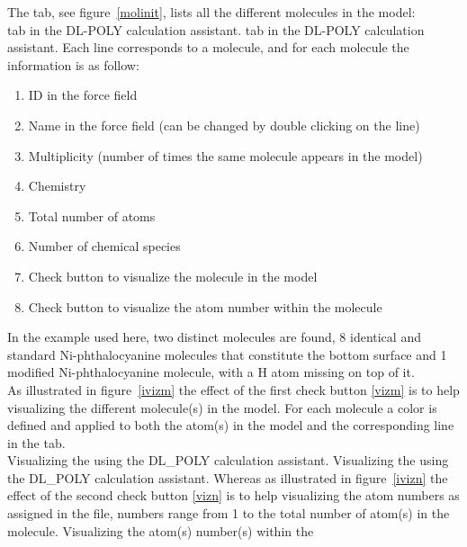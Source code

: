 The  tab, see figure~\ref{molinit}, lists all the different molecules in the model: \\
{ tab in the DL-POLY calculation assistant.}
{ tab in the DL-POLY calculation assistant.}
\clearpage
\noindent Each line corresponds to a molecule, and for each molecule the information is as follow: 
\begin{enumerate}
\item ID in the force field
\item Name in the force field (can be changed by double clicking on the line)
\item Multiplicity (number of times the same molecule appears in the model)
\item Chemistry
\item Total number of atoms
\item Number of chemical species
\item\label{vizm} Check button to visualize the molecule in the model
\item\label{vizn} Check button to visualize the atom number within the molecule
\end{enumerate}
In the  example used here, two distinct molecules are found, 8 identical and standard Ni-phthalocyanine molecules 
that constitute the bottom surface and 1 modified Ni-phthalocyanine molecule, with a H atom missing on top of it. \\
As illustrated in figure~\ref{ivizm} the effect of the first check button \ref{vizm} is to help visualizing the different molecule(s) 
in the model. 
For each molecule a color is defined and applied to both the atom(s) in the model and the corresponding line in the  tab. \\
{Visualizing the  using the DL\_POLY calculation assistant.}
{Visualizing the  using the DL\_POLY calculation assistant.}
\laf Whereas as illustrated in figure~\ref{ivizn} the effect of the second check button \ref{vizn} is to help visualizing the atom numbers
as assigned in the  file, numbers range from 1 to the total number of atom(s) in the molecule. 
\newpage
{}
{Visualizing the atom(s) number(s) within the }
